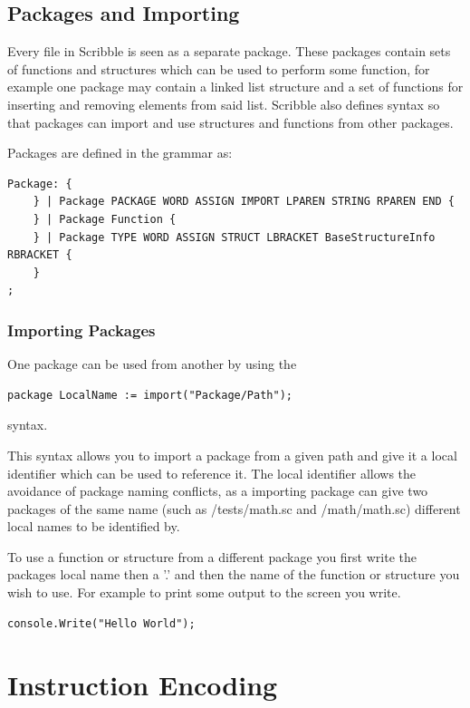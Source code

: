 \documentclass[]{final_report}
\begin{document}
\section{Packages and Importing}

Every file in Scribble is seen as a separate package. These packages contain sets of functions and structures which can be used to perform some function, for example one package may contain a linked list structure and a set of functions for inserting and removing elements from said list. Scribble also defines syntax so that packages can import and use structures and functions from other packages.

Packages are defined in the grammar as:
\begin{verbatim}
Package: {
	} | Package PACKAGE WORD ASSIGN IMPORT LPAREN STRING RPAREN END {
	} | Package Function {
	} | Package TYPE WORD ASSIGN STRUCT LBRACKET BaseStructureInfo RBRACKET {
	}
;
\end{verbatim}

\subsection{Importing Packages}

One package can be used from another by using the
\begin{verbatim}
package LocalName := import("Package/Path");
\end{verbatim}
syntax.

This syntax allows you to import a package from a given path and give it a local identifier which can be used to reference it. The local identifier allows the avoidance of package naming conflicts, as a importing package can give two packages of the same name (such as /tests/math.sc and /math/math.sc) different local names to be identified by.

To use a function or structure from a different package you first write the packages local name then a '.' and then the name of the function or structure you wish to use. For example to print some output to the screen you write.

\begin{verbatim}
console.Write("Hello World");
\end{verbatim}

\chapter{Instruction Encoding}
\end{document}
